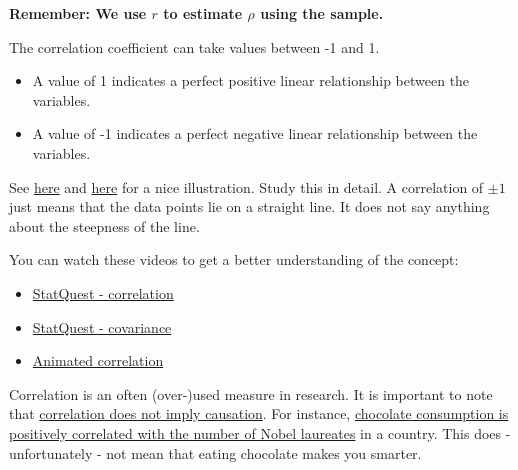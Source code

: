 \documentclass[
]{book}
\begin{document}
\textbf{Remember: We use \(r\) to estimate \(\rho\) using the sample.}

The correlation coefficient can take values between -1 and 1.

\begin{itemize}
\item
  A value of 1 indicates a perfect positive linear relationship between the variables.
\item
  A value of -1 indicates a perfect negative linear relationship between the variables.
\end{itemize}

See \href{https://en.wikipedia.org/wiki/Correlation\#/media/File:Correlation_examples2.svg}{here} and
\href{https://en.wikipedia.org/wiki/Correlation\#/media/File:Pearson_Correlation_Coefficient_and_associated_scatterplots.png}{here}
for a nice illustration. Study this in detail. A correlation of \(\pm 1\) just means that the data points lie on a straight line.
It does not say anything about the steepness of the line.

You can watch these videos to get a better understanding of the concept:

\begin{itemize}
\item
  \href{https://www.youtube.com/watch?v=xZ_z8KWkhXE&ab_channel=StatQuestwithJoshStarmer}{StatQuest - correlation}
\item
  \href{https://www.youtube.com/watch?v=qtaqvPAeEJY&ab_channel=StatQuestwithJoshStarmer}{StatQuest - covariance}
\item
  \href{https://www.youtube.com/watch?v=rijqfllOq6g&ab_channel=3-MinuteDataScience}{Animated correlation}
\end{itemize}

Correlation is an often (over-)used measure in research.
It is important to note that
\href{https://en.wikipedia.org/wiki/Correlation_does_not_imply_causation}{correlation does not imply causation}.
For instance,
\href{https://www.sciencedirect.com/science/article/pii/S2590291120300711}{chocolate consumption is positively correlated with the number of Nobel laureates} in a country.
This does - unfortunately - not mean that eating chocolate makes you smarter.
\end{document}
